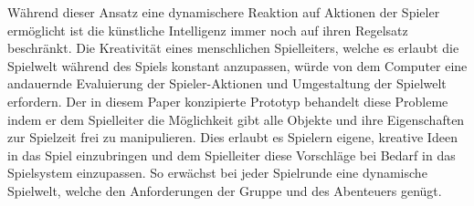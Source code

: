 Während dieser Ansatz eine dynamischere Reaktion auf Aktionen der Spieler ermöglicht ist die künstliche Intelligenz immer noch auf ihren Regelsatz beschränkt. Die Kreativität eines menschlichen Spielleiters, welche es erlaubt die Spielwelt während des Spiels konstant anzupassen, würde von dem Computer eine andauernde Evaluierung der Spieler-Aktionen und Umgestaltung der Spielwelt erfordern.\newline
Der in diesem Paper konzipierte Prototyp behandelt diese Probleme indem er dem Spielleiter die Möglichkeit gibt alle Objekte und ihre Eigenschaften zur Spielzeit frei zu manipulieren. Dies erlaubt es Spielern eigene, kreative Ideen in das Spiel einzubringen und dem Spielleiter diese Vorschläge bei Bedarf in das Spielsystem einzupassen. So erwächst bei jeder Spielrunde eine dynamische Spielwelt, welche den Anforderungen der Gruppe und des Abenteuers genügt.
